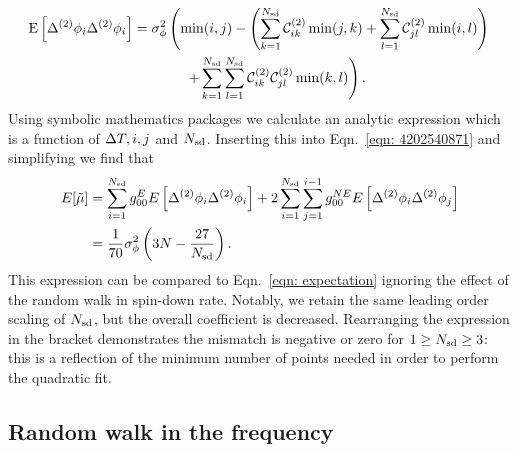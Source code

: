\begin{align}
\E{\Delta^{(2)}\phi_{i}\Delta^{(2)}\phi_{i}} & =
\sigma^{2}_{\phi} \left(\min(i, j) - \left(\s{k=1}{\Nsd}\CT_{ik} \min(j, k)
+ \s{l=1}{\Nsd}\CT_{jl}\min(i, l) \right)\right. \notag \\
& \hspace{13mm} \left. + \s{k=1}{\Nsd}\s{l=1}{\Nsd}\CT_{ik}\CT_{jl}\min(k, l)\right).
\label{eqn: expected mismatch dP0idP0j_k2}
\end{align}
Using symbolic mathematics packages we
calculate an analytic expression which is a function of $\Delta T, i, j$ and $N_{\textrm{sd}}$.
Inserting this into Eqn.~\eqref{eqn: 4202540871} and simplifying we find that
\begin{align}
E[\tilde{\mu}]  & = \sum_{i=1}^{N_{\textrm{sd}}}g_{00}^{E} E\left[\Delta^{(2)}\phi_{i}\Delta^{(2)}\phi_{i}\right]
+ 2 \sum_{i=1}^{N_{\textrm{sd}}}\sum_{j=1}^{i-1}g_{00}^{NE}E\left[\Delta^{(2)}\phi_{i}\Delta^{(2)}\phi_{j}\right]  \\
& = \frac{1}{70}\sigma_{\phi}^{2}\left(3N - \frac{27}{N_{\textrm{sd}}}\right).
\label{eqn: Expected mismatch RW in phase k2}
\end{align}
This expression can be compared to Eqn.~\eqref{eqn: expectation} ignoring the
effect of the random walk in spin-down rate. Notably, we retain the same
leading order scaling of $N_{\textrm{sd}}$, but the overall coefficient is decreased.
Rearranging the expression in the bracket demonstrates the mismatch is negative
or zero for $1 \ge N_{\textrm{sd}} \ge 3$: this is a reflection of the minimum number of
points needed in order to perform the quadratic fit.

\subsection{Random walk in the frequency}

